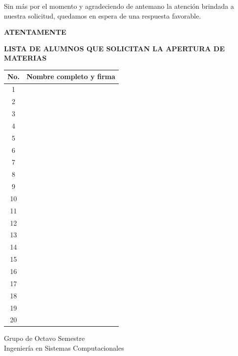 \documentclass[12pt]{article}
\begin{document}
\vspace{0.8cm}

Sin más por el momento y agradeciendo de antemano la atención brindada a nuestra solicitud, quedamos en espera de una respuesta favorable.

\vspace{1.5cm}

\begin{center}
\textbf{ATENTAMENTE}

\vspace{0.8cm}

\textbf{LISTA DE ALUMNOS QUE SOLICITAN LA APERTURA DE MATERIAS}
\end{center}

\vspace{0.5cm}

\begin{center}
\begin{tabular}{|c|>{\centering\arraybackslash}m{12cm}|}
\hline
\textbf{No.} & \textbf{Nombre completo y firma} \\
\hline
1 &  \\
\hline
2 &  \\
\hline
3 &  \\
\hline
4 &  \\
\hline
5 &  \\
\hline
6 &  \\
\hline
7 &  \\
\hline
8 &  \\
\hline
9 &  \\
\hline
10 &  \\
\hline
11 &  \\
\hline
12 &  \\
\hline
13 &  \\
\hline
14 &  \\
\hline
15 &  \\
\hline
16 &  \\
\hline
17 &  \\
\hline
18 &  \\
\hline
19 &  \\
\hline
20 &  \\
\hline
\end{tabular}
\end{center}

\vspace{1cm}

\begin{flushright}
Grupo de Octavo Semestre \\
Ingeniería en Sistemas Computacionales
\end{flushright}
\end{document}

